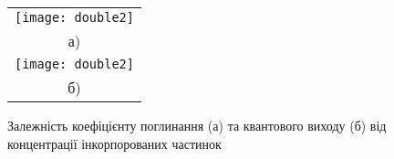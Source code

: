 \begin{figure}
\begin{tabular}{c}

\texttt{[image: double2]}\\
а)\\
\texttt{[image: double2]}
\\
б)
\end{tabular}
\caption{Залежність коефіцієнту поглинання (а) та квантового виходу (б)  від концентрації інкорпорованих частинок}\label{fig:qa}
\end{figure}
